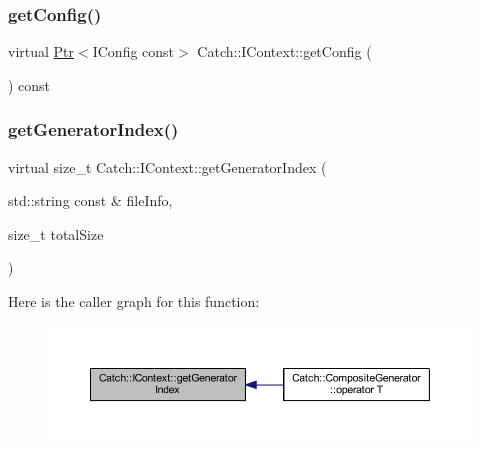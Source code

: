 \hypertarget{struct_catch_1_1_i_context_aee81c415899262e096ad8d6f686fa365}{}\label{struct_catch_1_1_i_context_aee81c415899262e096ad8d6f686fa365} 
\subsubsection{\texorpdfstring{get\+Config()}{getConfig()}}
{\footnotesize\ttfamily virtual \hyperlink{class_catch_1_1_ptr}{Ptr}$<$I\+Config const$>$ Catch\+::\+I\+Context\+::get\+Config (\begin{DoxyParamCaption}{ }\end{DoxyParamCaption}) const\hspace{0.3cm}{\ttfamily [pure virtual]}}

\hypertarget{struct_catch_1_1_i_context_a43e07088db43299ba129fbe6d3106e95}{}\label{struct_catch_1_1_i_context_a43e07088db43299ba129fbe6d3106e95} 
\subsubsection{\texorpdfstring{get\+Generator\+Index()}{getGeneratorIndex()}}
{\footnotesize\ttfamily virtual size\+\_\+t Catch\+::\+I\+Context\+::get\+Generator\+Index (\begin{DoxyParamCaption}\item[{std\+::string const \&}]{file\+Info,  }\item[{size\+\_\+t}]{total\+Size }\end{DoxyParamCaption})\hspace{0.3cm}{\ttfamily [pure virtual]}}

Here is the caller graph for this function\+:\nopagebreak
\begin{figure}[H]
\begin{center}
\leavevmode
\includegraphics[width=350pt]{struct_catch_1_1_i_context_a43e07088db43299ba129fbe6d3106e95_icgraph}
\end{center}
\end{figure}
\hypertarget{struct_catch_1_1_i_context_a684e4ae71d1fdf3060c352ecde1d122f}{}\label{struct_catch_1_1_i_context_a684e4ae71d1fdf3060c352ecde1d122f} 
